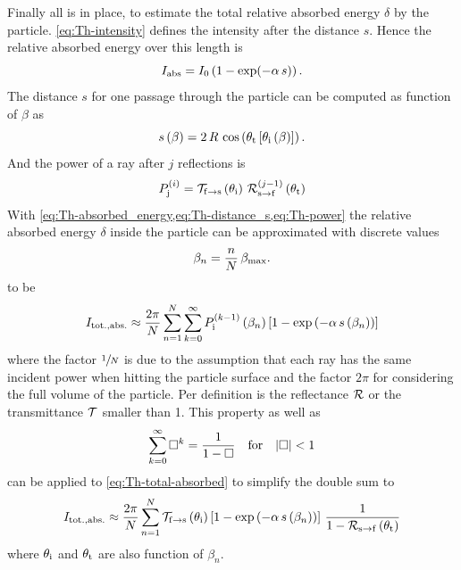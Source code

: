 Finally all is in place, to estimate the total relative absorbed energy 
$\delta$ by the particle.  \cref{eq:Th-intensity} defines the intensity after 
the distance $s$. Hence the relative absorbed energy over this length is
\begin{equation}
    I_{\mathrm{abs}} = I_{0} \left( 1 - \exp(-\alpha\,s) \right).
    \label{eq:Th-absorbed_energy}
\end{equation}
The distance $s$ for one passage through the particle can be computed as 
function of $\beta$ as
\begin{equation}
  s\left( \beta \right) = 2\,R\,\cos\left( \theta_{\mathrm{t}}\left[ \theta_{\mathrm{i}}\left( 
    \beta \right) \right]
    \right).
    \label{eq:Th-distance_s}
\end{equation}
And the power of a ray after $j$ reflections is
\begin{equation}
  P_{\mathrm{j}}^{(i)} =
  \mathcal{T}_{\mathrm{f}\rightarrow\mathrm{s}}\left( \theta_{\mathrm{i}} \right) \,
  \mathcal{R}^{(j-1)}_{\mathrm{s}\rightarrow\mathrm{f}}\left( \theta_{\mathrm{t}} \right)
  \label{eq:Th-power}
\end{equation}
With \cref{eq:Th-absorbed_energy,eq:Th-distance_s,eq:Th-power} the relative 
absorbed energy $\delta$ inside the particle can be approximated with discrete 
values
\begin{equation}
  \beta_{n} = \frac{n}{N}\,\beta_{\mathrm{max}}.
  \label{eq:Th-beta-disc}
\end{equation}
to be
\begin{equation}
  I_{\mathrm{tot.,abs.}} \approx
  \frac{2\pi}{N}
  \sum\limits_{n=1}^{N}
  \sum\limits_{k=0}^{\infty}P_{\mathrm{i}}^{(k-1)}\left( \beta_{n} \right)\left[ 1 - 
  \exp\left( -\alpha\,s\left( \beta_{n} \right) \right) \right]
  \label{eq:Th-total-absorbed}
\end{equation}
where the factor $\sfrac{1}{N}$ is due to the assumption that each ray has the 
same incident power when hitting the particle surface and the factor $2\pi$ for 
considering the full volume of the particle. Per definition is the reflectance 
$\mathcal{R}$ or the transmittance $\mathcal{T}$ smaller than 1. This property as 
well as
\begin{equation}
  \sum\limits^{\infty}_{k=0} \Box^{k} = \frac{1}{1-\Box}
  \quad\text{for}\quad\abs{\Box} < 1
\end{equation}
can be applied to \cref{eq:Th-total-absorbed} to simplify the double sum to
\begin{equation}
  I_{\mathrm{tot.,abs.}} \approx
  \frac{2\pi}{N}
  \sum\limits_{n=1}^{N}
  \mathcal{T}_{\mathrm{f}\rightarrow\mathrm{s}}\left( \theta_{\mathrm{i}} \right)
  \left[ 1 - \exp\left( -\alpha\,s\left( \beta_{n} \right) \right) \right]
\,\frac{1}{1-\mathcal{R}_{\mathrm{s}\rightarrow\mathrm{f}}\left( \theta_{\mathrm{t}} \right)}
  \label{eq:Th-total-absorbed-simp}
\end{equation}
where $\theta_{\mathrm{i}}$ and $\theta_{\mathrm{t}}$ are also function of $\beta_{n}$.

